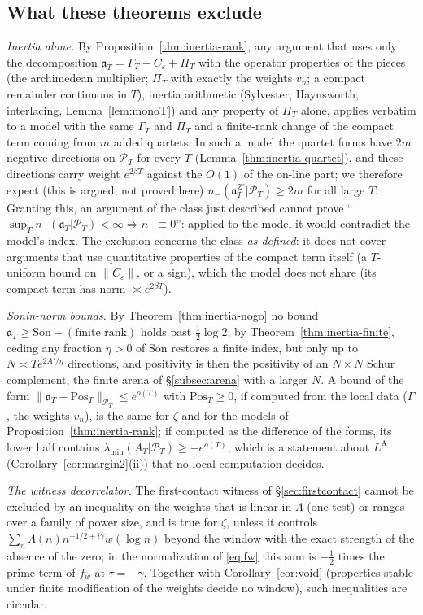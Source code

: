 \documentclass[11pt]{amsart}
\theoremstyle{definition}
\theoremstyle{remark}
\newcommand{\PT}{\mathcal P_T}
\newcommand{\lamA}{\lambda_{\min}(A_T|\PT)}
\newcommand{\PiT}{\Pi_T}
\begin{document}
\subsection{What these theorems exclude}\label{subsec:inertia-excl}
\emph{Inertia alone.} By Proposition~\ref{thm:inertia-rank}, any argument that uses only the decomposition
$\mathfrak a_T=\Gamma_T-C_\varepsilon+\PiT$ with the operator properties of the pieces (the archimedean multiplier;
$\PiT$ with exactly the weights $v_n$; a compact remainder continuous in $T$), inertia arithmetic (Sylvester,
Haynsworth, interlacing, Lemma~\ref{lem:monoT}) and any property of $\PiT$ alone, applies verbatim to a model with
the same $\Gamma_T$ and $\PiT$ and a finite-rank change of the compact term coming from $m$ added quartets.
In such a model the quartet forms have $2m$ negative directions on $\PT$ for every $T$
(Lemma~\ref{thm:inertia-quartet}), and these directions carry weight $e^{2\beta T}$ against the $O(1)$ of the
on-line part; we therefore expect (this is argued, not proved here) $n_-(\mathfrak a^{Z'}_T|\PT)\ge2m$ for all large $T$.
Granting this, an argument of the class just described cannot prove ``$\sup_Tn_-(\mathfrak a_T|\PT)<\infty
\Rightarrow n_-\equiv0$'': applied to the model it would contradict the model's index. The exclusion concerns the class
\emph{as defined}: it does not cover arguments that use quantitative properties of the compact term itself (a
$T$-uniform bound on $\|C_\varepsilon\|$, or a sign), which the model does not share (its compact term has norm
$\asymp e^{2\beta T}$).

\emph{Sonin-norm bounds.} By Theorem~\ref{thm:inertia-nogo} no bound
$\mathfrak a_T\ge\mathrm{Son}-(\text{finite rank})$ holds past $\frac12\log2$; by
Theorem~\ref{thm:inertia-finite}, ceding any fraction $\eta>0$ of $\mathrm{Son}$ restores a finite index, but only
up to $N\asymp Te^{2A'/\eta}$ directions, and positivity is then the positivity of an $N\times N$ Schur complement,
the finite arena of \S\ref{subsec:arena} with a larger $N$. A bound of the form
$\|\mathfrak a_T-\mathrm{Pos}_T\|_{\PT}\le e^{o(T)}$ with $\mathrm{Pos}_T\ge0$, if computed from the local data
($\Gamma$, the weights $v_n$), is the same for $\zeta$ and for the models of Proposition~\ref{thm:inertia-rank};
if computed as the difference of the forms, its lower half contains $\lamA\ge-e^{o(T)}$, which is a statement about
$L^{\mathrm A}$ (Corollary~\ref{cor:margin2}(ii)) that no local computation decides.

\emph{The witness decorrelator.} The first-contact witness of \S\ref{sec:firstcontact} cannot be excluded by an
inequality on the weights that is linear in $\Lambda$ (one test) or ranges over a family of power size, and is
true for $\zeta$, unless it controls $\sum_n\Lambda(n)n^{-1/2+i\gamma}w(\log n)$ beyond the window with the exact
strength of the absence of the zero; in the normalization of \eqref{eq:fw} this sum is
$-\frac12$ times the prime term of $f_w$ at $\tau=-\gamma$. Together with Corollary~\ref{cor:void} (properties
stable under finite modification of the weights decide no window), such inequalities are circular.
\end{document}
